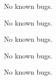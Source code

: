 
\begin{DoxyRefList}
\item[\label{bug__bug000001}%
\Hypertarget{bug__bug000001}%
File \hyperlink{DataGrabber_8cpp}{Data\+Grabber.cpp} ]No known bugs.  
\item[\label{bug__bug000002}%
\Hypertarget{bug__bug000002}%
File \hyperlink{IEX_8cpp}{I\+EX.cpp} ]No known bugs. 

No known bugs.  
\item[\label{bug__bug000004}%
\Hypertarget{bug__bug000004}%
File \hyperlink{watchlist_8cpp}{watchlist.cpp} ]No known bugs. 

No known bugs. 
\end{DoxyRefList}